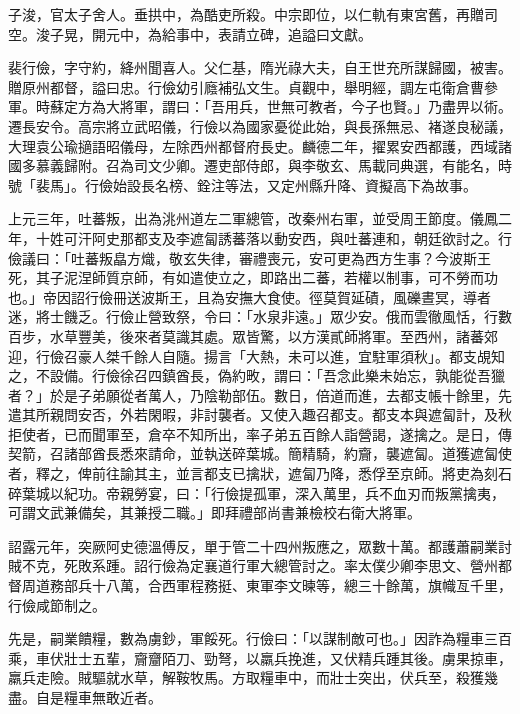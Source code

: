 \begin{pinyinscope}
 子浚，官太子舍人。垂拱中，為酷吏所殺。中宗即位，以仁軌有東宮舊，再贈司空。浚子晃，開元中，為給事中，表請立碑，追謚曰文獻。



 裴行儉，字守約，絳州聞喜人。父仁基，隋光祿大夫，自王世充所謀歸國，被害。贈原州都督，謚曰忠。行儉幼引廕補弘文生。貞觀中，舉明經，調左屯衛倉曹參軍。時蘇定方為大將軍，謂曰：「吾用兵，世無可教者，今子也賢。」乃盡畀以術。遷長安令。高宗將立武昭儀，行儉以為國家憂從此始，與長孫無忌、褚遂良秘議，大理袁公瑜擿語昭儀母，左除西州都督府長史。麟德二年，擢累安西都護，西域諸國多慕義歸附。召為司文少卿。遷吏部侍郎，與李敬玄、馬載同典選，有能名，時號「裴馬」。行儉始設長名榜、銓注等法，又定州縣升降、資擬高下為故事。



 上元三年，吐蕃叛，出為洮州道左二軍總管，改秦州右軍，並受周王節度。儀鳳二年，十姓可汗阿史那都支及李遮匐誘蕃落以動安西，與吐蕃連和，朝廷欲討之。行儉議曰：「吐蕃叛皛方熾，敬玄失律，審禮喪元，安可更為西方生事？今波斯王死，其子泥涅師質京師，有如遣使立之，即路出二蕃，若權以制事，可不勞而功也。」帝因詔行儉冊送波斯王，且為安撫大食使。徑莫賀延磧，風礫晝冥，導者迷，將士饑乏。行儉止營致祭，令曰：「水泉非遠。」眾少安。俄而雲徹風恬，行數百步，水草豐美，後來者莫識其處。眾皆驚，以方漢貳師將軍。至西州，諸蕃郊迎，行儉召豪人桀千餘人自隨。揚言「大熱，未可以進，宜駐軍須秋」。都支覘知之，不設備。行儉徐召四鎮酋長，偽約畋，謂曰：「吾念此樂未始忘，孰能從吾獵者？」於是子弟願從者萬人，乃陰勒部伍。數日，倍道而進，去都支帳十餘里，先遣其所親問安否，外若閑暇，非討襲者。又使入趣召都支。都支本與遮匐計，及秋拒使者，已而聞軍至，倉卒不知所出，率子弟五百餘人詣營謁，遂擒之。是日，傳契箭，召諸部酋長悉來請命，並執送碎葉城。簡精騎，約齎，襲遮匐。道獲遮匐使者，釋之，俾前往諭其主，並言都支已擒狀，遮匐乃降，悉俘至京師。將吏為刻石碎葉城以紀功。帝親勞宴，曰：「行儉提孤軍，深入萬里，兵不血刃而叛黨擒夷，可謂文武兼備矣，其兼授二職。」即拜禮部尚書兼檢校右衛大將軍。



 詔露元年，突厥阿史德溫傅反，單于管二十四州叛應之，眾數十萬。都護蕭嗣業討賊不克，死敗系踵。詔行儉為定襄道行軍大總管討之。率太僕少卿李思文、營州都督周道務部兵十八萬，合西軍程務挺、東軍李文暕等，總三十餘萬，旗幟亙千里，行儉咸節制之。



 先是，嗣業饋糧，數為虜鈔，軍餒死。行儉曰：「以謀制敵可也。」因詐為糧車三百乘，車伏壯士五輩，齎齏陌刀、勁弩，以羸兵挽進，又伏精兵踵其後。虜果掠車，羸兵走險。賊驅就水草，解鞍牧馬。方取糧車中，而壯士突出，伏兵至，殺獲幾盡。自是糧車無敢近者。




\end{pinyinscope}
